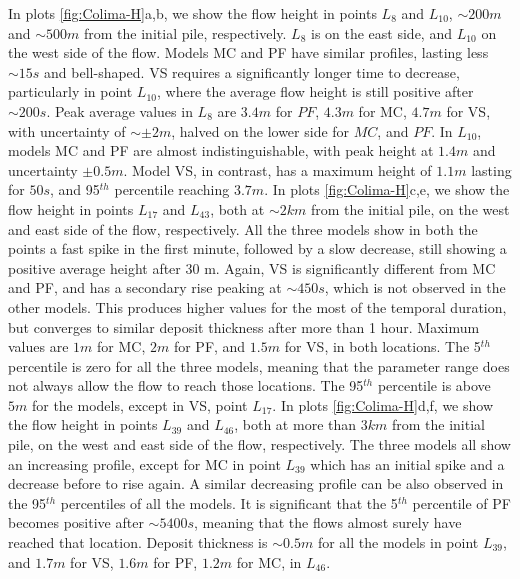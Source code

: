 \documentclass{article}
\begin{document}
In plots \ref{fig:Colima-H}a,b, we show the flow height in points $L_8$ and $L_{10}$, $\sim 200 m$ and $\sim 500 m$ from the initial pile, respectively. $L_8$ is on the east side, and $L_{10}$ on the west side of the flow. Models MC and PF have similar profiles, lasting less $\sim 15 s$ and bell-shaped. VS requires a significantly longer time to decrease, particularly in point $L_{10}$, where the average flow height is still positive after $\sim 200 s$. Peak average values in $L_8$ are $3.4 m$ for $PF$, $4.3 m$ for MC, $4.7 m$ for VS, with uncertainty of $\sim \pm 2 m$, halved on the lower side for $MC$, and $PF$. In $L_{10}$, models MC and PF are almost indistinguishable, with peak height at $1.4 m$ and uncertainty $\pm 0.5 m$. Model VS, in contrast, has a maximum height of $1.1 m$ lasting for $50s$, and 95$^{th}$ percentile reaching $3.7 m$. In plots \ref{fig:Colima-H}c,e, we show the flow height in points $L_{17}$ and $L_{43}$, both at $\sim 2 km$ from the initial pile, on the west and east side of the flow, respectively. All the three models show in both the points a fast spike in the first minute, followed by a slow decrease, still showing a positive average height after 30 m. Again, VS is significantly different from MC and PF, and has a secondary rise peaking at $\sim 450 s$, which is not observed in the other models. This produces higher values for the most of the temporal duration, but converges to similar deposit thickness after more than 1 hour. Maximum values are $1 m$ for MC, $2 m$ for PF, and $1.5 m$ for VS, in both locations. The 5$^{th}$ percentile is zero for all the three models, meaning that the parameter range does not always allow the flow to reach those locations. The 95$^{th}$ percentile is above $5m$ for the models, except in VS, point $L_{17}$. In plots \ref{fig:Colima-H}d,f, we show the flow height in points $L_{39}$ and $L_{46}$, both at more than $3 km$ from the initial pile, on the west and east side of the flow, respectively. The three models all show an increasing profile, except for MC in point $L_{39}$ which has an initial spike and a decrease before to rise again. A similar decreasing profile can be also observed in the 95$^{th}$ percentiles of all the models. It is significant that the 5$^{th}$ percentile of PF becomes positive after $\sim 5400 s$, meaning that the flows almost surely have reached that location. Deposit thickness is $\sim 0.5 m$ for all the models in point $L_{39}$, and $1.7 m$ for VS, $1.6 m$ for PF, $1.2 m$ for MC, in $L_{46}$.
\end{document}
